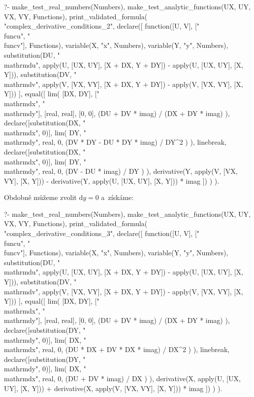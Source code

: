 \begin{prolog}
?-	make_test_real_numbers(Numbers),
	make_test_analytic_functions(UX, UY, VX, VY, Functions),
	print_validated_formula(
		"complex_derivative_conditions_2",
		declare([
			function([U, V], ["\\func{u}", "\\func{v}"], Functions), 
			variable(X, "x", Numbers),
			variable(Y, "y", Numbers),
			substitution(DU, "\\mathrm{d}u", apply(U, [UX, UY], [X + DX, Y + DY]) - apply(U, [UX, UY], [X, Y])),
			substitution(DV, "\\mathrm{d}v", apply(V, [VX, VY], [X + DX, Y + DY]) - apply(V, [VX, VY], [X, Y]))
		],
			equal([
				lim(
					[DX, DY], ["\\mathrm{d}x", "\\mathrm{d}y"], [real, real], [0, 0],
					(DU + DV * imag) / (DX + DY * imag)
				),
				declare([substitution(DX, "\\mathrm{d}x", 0)],
					lim(
						DY, "\\mathrm{d}y", real, 0,
						(DV * DY - DU * DY * imag) / DY^2
					)
				),
				linebreak,
				declare([substitution(DX, "\\mathrm{d}x", 0)],
					lim(
						DY, "\\mathrm{d}y", real, 0,
						(DV - DU * imag) / DY
					)
				),
				derivative(Y, apply(V, [VX, VY], [X, Y])) - derivative(Y, apply(U, [UX, UY], [X, Y])) * imag
			])
		)
	).
\end{prolog}

Obdobně můžeme zvolit \(\mathrm{d}y = 0\) a~získáme:

\begin{prolog}
?-	make_test_real_numbers(Numbers),
	make_test_analytic_functions(UX, UY, VX, VY, Functions),
	print_validated_formula(
		"complex_derivative_conditions_3",
		declare([
			function([U, V], ["\\func{u}", "\\func{v}"], Functions), 
			variable(X, "x", Numbers),
			variable(Y, "y", Numbers),
			substitution(DU, "\\mathrm{d}u", apply(U, [UX, UY], [X + DX, Y + DY]) - apply(U, [UX, UY], [X, Y])),
			substitution(DV, "\\mathrm{d}v", apply(V, [VX, VY], [X + DX, Y + DY]) - apply(V, [VX, VY], [X, Y]))
		],
			equal([
				lim(
					[DX, DY], ["\\mathrm{d}x", "\\mathrm{d}y"], [real, real], [0, 0],
					(DU + DV * imag) / (DX + DY * imag)
				),
				declare([substitution(DY, "\\mathrm{d}y", 0)],
					lim(
						DX, "\\mathrm{d}x", real, 0,
						(DU * DX + DV * DX * imag) / DX^2
					)
				),
				linebreak,
				declare([substitution(DY, "\\mathrm{d}y", 0)],
					lim(
						DX, "\\mathrm{d}x", real, 0,
						(DU + DV * imag) / DX
					)
				),
				derivative(X, apply(U, [UX, UY], [X, Y])) + derivative(X, apply(V, [VX, VY], [X, Y])) * imag
			])
		)
	).
\end{prolog}

